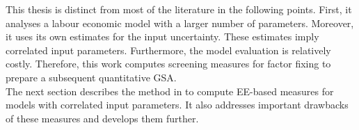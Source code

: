 \newline
This thesis is distinct from most of the literature in the following points. First, it analyses a labour economic model with a larger number of parameters. Moreover, it uses its own estimates for the input uncertainty. These estimates imply correlated input parameters. Furthermore, the model evaluation is relatively costly. Therefore, this work computes screening measures for factor fixing to prepare a subsequent quantitative GSA.
\\
\newline
The next section describes the method in \cite{ge2014efficient} to compute EE-based measures for models with correlated input parameters. It also addresses important drawbacks of these measures and develops them further.